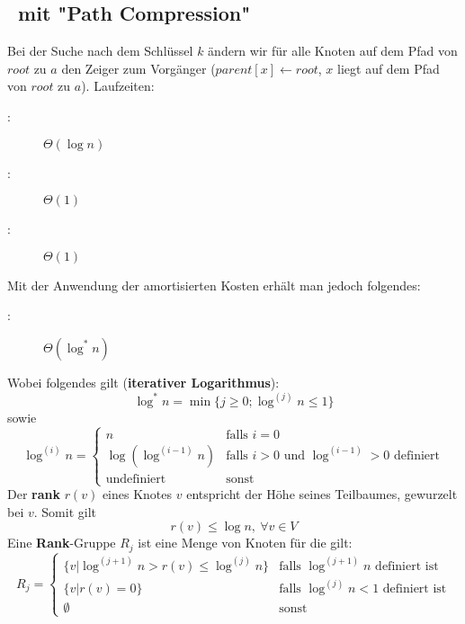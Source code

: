 \subsection{\find~mit "Path Compression"}
Bei der Suche nach dem Schlüssel $k$ ändern wir für alle Knoten auf dem Pfad von $root$ zu $a$ den Zeiger zum Vorgänger ($parent[x] \leftarrow root$, $x$ liegt auf dem Pfad von $root$ zu $a$).
Laufzeiten:
\begin{description}
	\item[\find:] $\Theta(\log n)$
	\item[\union:] $\Theta(1)$
	\item[\makeset:] $\Theta(1)$
\end{description}
Mit der Anwendung der amortisierten Kosten erhält man jedoch folgendes:
\begin{description}
	\item[\find:] $\Theta(\log^{*} n)$
\end{description}
Wobei folgendes gilt (\textbf{iterativer Logarithmus}):
\[\log^{*} n = \min \{j \geq 0;\log^{(j)} n \leq 1\}\]
sowie
\[\log^{(i)} n = \left\{ \begin{array}{ll}
		n & \text{falls } i=0\\
		\log(\log^{(i-1)}n) & \text{falls } i>0 \text{ und } \log^{(i-1)} >0 \text{ definiert}\\
		\text{undefiniert}&\text{sonst}
	\end{array}\right. \]
Der \textbf{rank} $r(v)$ eines Knotes $v$ entspricht der Höhe seines Teilbaumes, gewurzelt bei $v$. Somit gilt
\[r(v) \leq \log n,~\forall v \in V\]
Eine \textbf{Rank}-Gruppe $R_j$ ist eine Menge von Knoten für die gilt:
\[R_j=\left\{
	\begin{array}{ll}
		\{v | \log^{(j+1)} n > r(v) \leq \log^{(j)}n\} & \text{falls } \log^{(j+1)} n \text{ definiert ist}\\
		\{v | r(v) = 0\} & \text{falls } \log^{(j)} n < 1 \text{ definiert ist}\\
		\emptyset & \text{sonst}
	\end{array}
\right.\]
\topbreak
\up
{}
